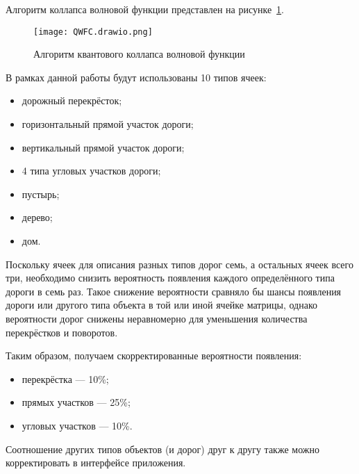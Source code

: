 Алгоритм коллапса волновой функции представлен на рисунке~\ref{fig:QWFC}.

\newpage

\begin{figure}[h!]
    \centering
    \texttt{[image: QWFC.drawio.png]}
    \caption{Алгоритм квантового коллапса волновой функции}
    \label{fig:QWFC}
\end{figure}

В рамках данной работы будут использованы 10 типов ячеек:

\begin{itemize}
    \item дорожный перекрёсток;
    \item горизонтальный прямой участок дороги;
    \item вертикальный прямой участок дороги;
    \item 4 типа угловых участков дороги;
    \item пустырь;
    \item дерево;
    \item дом.
\end{itemize}

Поскольку ячеек для описания разных типов дорог семь, а остальных ячеек всего три, необходимо снизить вероятность появления каждого определённого типа дороги в семь раз. Такое снижение вероятности сравняло бы шансы появления дороги или другого типа объекта в той или иной ячейке матрицы, однако вероятности дорог снижены неравномерно для уменьшения количества перекрёстков и поворотов.

Таким образом, получаем скорректированные вероятности появления:
\begin{itemize}
    \item перекрёстка --- 10\%;
    \item прямых участков --- 25\%;
    \item угловых участков --- 10\%.
\end{itemize}

Соотношение других типов объектов (и дорог) друг к другу также можно корректировать в интерфейсе приложения.
